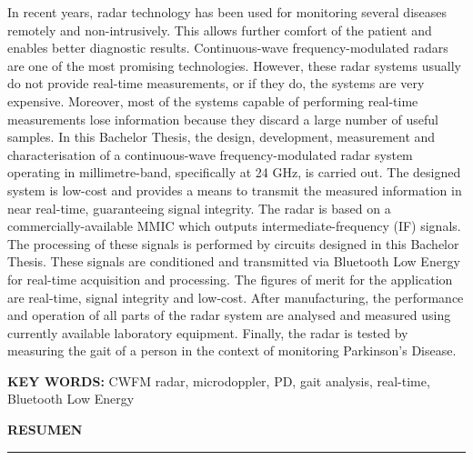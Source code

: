 In recent years, radar technology has been used for monitoring several diseases remotely and non-intrusively. This allows further comfort of the patient and enables better diagnostic results. Continuous-wave frequency-modulated radars are one of the most promising technologies. However, these radar systems usually do not provide real-time measurements, or if they do, the systems are very expensive. Moreover, most of the systems capable of performing real-time measurements lose information because they discard a large number of useful samples.
In this Bachelor Thesis, the design, development, measurement and characterisation of a continuous-wave frequency-modulated radar system operating in millimetre-band, specifically at 24 GHz, is carried out. The designed system is low-cost and provides a means to transmit the measured information in near real-time, guaranteeing signal integrity.
The radar is based on a commercially-available MMIC which outputs intermediate-frequency (IF) signals. The processing of these signals is performed by circuits designed in this Bachelor Thesis. These signals are conditioned and transmitted via Bluetooth Low Energy for real-time acquisition and processing. The figures of merit for the application are real-time, signal integrity and low-cost.
After manufacturing, the performance and operation of all parts of the radar system are analysed and measured using currently available laboratory equipment.
Finally, the radar is tested by measuring the gait of a person in the context of monitoring Parkinson's Disease.


\vspace{2cm}
\noindent \textbf{KEY WORDS:} CWFM radar, microdoppler, PD, gait analysis, real-time, Bluetooth Low Energy\\[3mm]


\pagebreak[1] \vfill \clearpage \thispagestyle{empty} \quad
\thispagestyle{empty}
\thispagestyle{empty}
\begin{center}
	\textbf{\large RESUMEN} \\
	\noindent\rule{10cm}{0.8pt}
\end{center}

